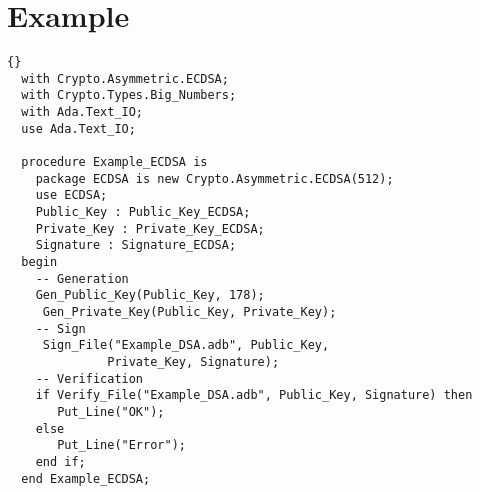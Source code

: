 \section{Example}
\begin{lstlisting}{}
  with Crypto.Asymmetric.ECDSA;
  with Crypto.Types.Big_Numbers;
  with Ada.Text_IO;
  use Ada.Text_IO;

  procedure Example_ECDSA is
  	package ECDSA is new Crypto.Asymmetric.ECDSA(512);
  	use ECDSA;
  	Public_Key : Public_Key_ECDSA;
  	Private_Key : Private_Key_ECDSA;
  	Signature : Signature_ECDSA;
  begin
    -- Generation
    Gen_Public_Key(Public_Key, 178);
  	 Gen_Private_Key(Public_Key, Private_Key);
  	-- Sign
  	 Sign_File("Example_DSA.adb", Public_Key, 
  	          Private_Key, Signature);
  	-- Verification
  	if Verify_File("Example_DSA.adb", Public_Key, Signature) then
       Put_Line("OK");
    else 
       Put_Line("Error");
    end if;
  end Example_ECDSA;
\end{lstlisting}
